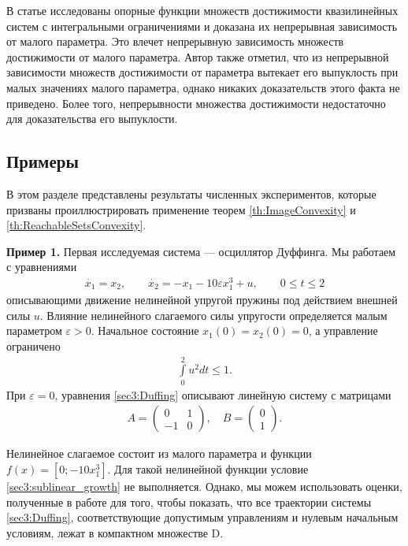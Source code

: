 \documentclass[../main.tex]{subfiles}
\begin{document}
\begin{zam} 
 В статье \cite{Albrecht2} исследованы опорные функции множеств достижимости квазилинейных систем с интегральными ограничениями и доказана их непрерывная зависимость от малого параметра.
 Это влечет непрерывную зависимость множеств достижимости от малого параметра. 
 Автор также отметил, что из непрерывной зависимости множеств достижимости от параметра вытекает его выпуклость при малых значениях малого параметра, однако никаких доказательств этого факта не приведено. 
 Более того, непрерывности множества достижимости недостаточно для доказательства его выпуклости.
\end{zam}

\subsection{Примеры}

В этом разделе представлены результаты численных экспериментов, которые призваны проиллюстрировать применение теорем \ref{th:ImageConvexity} и \ref{th:ReachableSetsConvexity}. 

\textbf{Пример 1.}
 Первая исследуемая система --- осциллятор Дуффинга. 
 Мы работаем с уравнениями
 \begin{gather}\label{sec3:Duffing}
 \dot{x_1} = x_2, \qquad
 \dot{x_2} = -x_1 - 10 \varepsilon x_1^3 + u,\qquad 0\leqslant t \leqslant 2
 \end{gather}
 описывающими движение нелинейной упругой пружины под действием внешней силы $u$. 
 Влияние нелинейного слагаемого силы упругости определяется малым параметром $\varepsilon > 0$. 
Начальное состояние $x_1(0) = x_2(0) = 0 $, а управление ограничено 
 \begin{gather}\label{Duffing_controls}
 \int\limits_0^2u^2dt \leqslant 1.
 \end{gather}
 При $\varepsilon = 0$, уравнения \eqref{sec3:Duffing} описывают линейную систему с матрицами 
 \begin{gather*}
 A = \begin{pmatrix} 0 & 1\\
 -1 & 0
 \end{pmatrix}, \quad B = \begin{pmatrix}
 0\\
 1
 \end{pmatrix}.
 \end{gather*}
 
 Нелинейное слагаемое состоит из малого параметра и функции $f(x) = [0;-10x_1^3]$. 
 Для такой нелинейной функции условие \eqref{sec3:sublinear_growth} не выполняется. 
 Однако, мы можем использовать оценки, полученные в работе \cite{Zykov2019} для того, чтобы показать, что все траектории системы \eqref{sec3:Duffing}, соответствующие допустимым управлениям и нулевым начальным условиям, лежат в компактном множестве D. 
 
\end{document}
